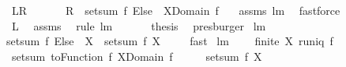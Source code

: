 \begin{isabellebody}
\ \ {\isacharparenleft}\ {\isachardoublequoteopen}{\isacharquery}L{\isacharequal}{\isacharquery}R{\isachardoublequoteclose}{\isacharparenright}\ \isanewline
%
\isadelimproof
%
\endisadelimproof
%
\isatagproof
{}\isamarkupfalse%
\ {\isacharminus}\isanewline
\ \ \isamarkupfalse%
\ {\isachardoublequoteopen}{\isacharquery}R\ {\isacharequal}\ setsum\ {\isacharparenleft}f\ Else\ {}{\isacharparenright}\ {\isacharparenleft}X{\isasyminter}Domain\ f{\isacharparenright}\ {\isachardoublequoteclose}\ \isamarkupfalse%
\ assms{\isacharparenleft}{}{\isacharparenright}\ lm{}{}{}\ \isamarkupfalse%
\ fastforce\isanewline
\ \ \isamarkupfalse%
\ \isamarkupfalse%
\ {\isachardoublequoteopen}{\isachardot}{\isachardot}{\isachardot}\ {\isacharequal}\ {\isacharquery}L{\isachardoublequoteclose}\ \isamarkupfalse%
\ assms{\isacharparenleft}{}{\isacharparenright}\ \isamarkupfalse%
\ {\isacharparenleft}rule\ lm{}{}{}{\isacharparenright}\ \isanewline
\ \ \isamarkupfalse%
\ \isamarkupfalse%
\ {\isacharquery}thesis\ \isamarkupfalse%
\ presburger\isanewline
{}\isamarkupfalse%
%
\endisatagproof
{\isafoldproof}%
%
\isadelimproof
\isanewline
%
\endisadelimproof
\isanewline
{}\isamarkupfalse%
\ lm{}{}{}{\isacharcolon}\ \isanewline
\ \ {\isachardoublequoteopen}setsum\ {\isacharparenleft}f\ Else\ {}{\isacharparenright}\ X\ {\isacharequal}\ setsum{\isacharprime}\ f\ X{\isachardoublequoteclose}\ \isanewline
%
\isadelimproof
\ \ %
\endisadelimproof
%
\isatagproof
{}\isamarkupfalse%
\ fast%
\endisatagproof
{\isafoldproof}%
%
\isadelimproof
\isanewline
%
\endisadelimproof
\isanewline
{}\isamarkupfalse%
\ lm{}{}{}{\isacharcolon}\ \isanewline
\ \ \ {\isachardoublequoteopen}finite\ X{\isachardoublequoteclose}\ {\isachardoublequoteopen}runiq\ f{\isachardoublequoteclose}\ \isanewline
\ \ \ {\isachardoublequoteopen}setsum\ {\isacharparenleft}toFunction\ f{\isacharparenright}\ {\isacharparenleft}X{\isasyminter}Domain\ f{\isacharparenright}\ \ \ {\isacharequal}\ \ \ setsum{\isacharprime}\ f\ X{\isachardoublequoteclose}\isanewline
%
\isadelimproof
\ \ %
\endisadelimproof
%
\isatagproof
{}\isamarkupfalse%

\end{isabellebody}
